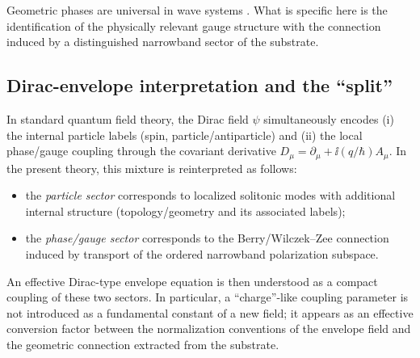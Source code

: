 Geometric phases are universal in wave systems \citep{Pancharatnam1956,Berry1984,WilczekZee1984,Bliokh2015SpinOrbit,Cisowski2022}.
What is specific here is the identification of the physically relevant gauge structure with the
connection induced by a distinguished narrowband sector of the substrate.

\subsection{Dirac-envelope interpretation and the ``split''}

In standard quantum field theory, the Dirac field $\psi$ simultaneously encodes (i) the internal particle labels
(spin, particle/antiparticle) and (ii) the local phase/gauge coupling through the covariant derivative
$D_\mu=\partial_\mu+\ii(q/\hbar)A_\mu$.
In the present theory, this mixture is reinterpreted as follows:
\begin{itemize}
\item the \emph{particle sector} corresponds to localized solitonic modes with additional internal structure
(topology/geometry and its associated labels);
\item the \emph{phase/gauge sector} corresponds to the Berry/Wilczek--Zee connection induced by transport of the
ordered narrowband polarization subspace.
\end{itemize}
An effective Dirac-type envelope equation is then understood as a compact coupling of these two sectors.
In particular, a ``charge''-like coupling parameter is not introduced as a fundamental constant of a new field;
it appears as an effective conversion factor between the normalization conventions of the envelope field and the
geometric connection extracted from the substrate.
